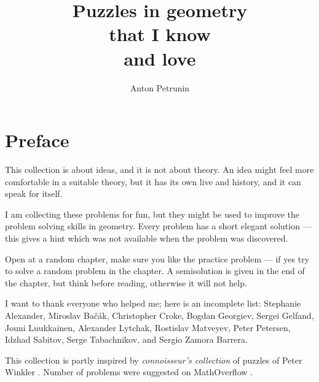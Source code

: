 \documentclass[twoside]{book}
\begin{document}
\title{Puzzles in geometry \\
that I know \\ and love}
\author{Anton Petrunin}
\date{}
\maketitle



\thispagestyle{empty}
\tableofcontents
\thispagestyle{empty}

\newpage
\thispagestyle{empty}
\section*{Preface}

This collection is about ideas, and it is not about theory.
An idea might feel more comfortable in a suitable theory,
but it has its own live and history, and it can speak for itself.

I am collecting these problems for fun, 
but they might be used to improve 
the problem solving skills in geometry.
Every problem has a short elegant solution ---
this gives a hint which was not available
when the problem was discovered.


Open at a random chapter, make sure you like the practice problem --- if yes try to solve a random problem in the chapter.
A semisolution is given in the end of the chapter,
but think before reading,
otherwise it will not help. 

I want to thank everyone who helped me;
here is an incomplete list:
Stephanie Alexander,
Miroslav Ba\v{c}\'{a}k, 
Christopher Croke,
Bogdan Georgiev,
Sergei Gelfand,
Jouni Luukkainen,
Alexander Lytchak,
Rostislav Matveyev, 
Peter Petersen, 
Idzhad Sabitov,
Serge Tabachnikov, and
Sergio Zamora Barrera.

This collection is partly inspired by \emph{connoisseur's collection} of puzzles of Peter Winkler \cite[][]{winkler}.
Number of problems were suggested on MathOverflow \cite[][]{One-step}.

\vfill
\end{document}
